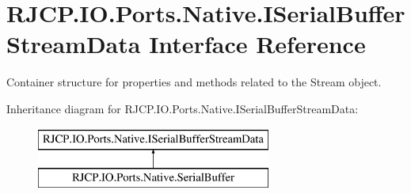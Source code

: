 \hypertarget{interface_r_j_c_p_1_1_i_o_1_1_ports_1_1_native_1_1_i_serial_buffer_stream_data}{}\section{R\+J\+C\+P.\+I\+O.\+Ports.\+Native.\+I\+Serial\+Buffer\+Stream\+Data Interface Reference}
\label{interface_r_j_c_p_1_1_i_o_1_1_ports_1_1_native_1_1_i_serial_buffer_stream_data}


Container structure for properties and methods related to the Stream object.  


Inheritance diagram for R\+J\+C\+P.\+I\+O.\+Ports.\+Native.\+I\+Serial\+Buffer\+Stream\+Data\+:\begin{figure}[H]
\begin{center}
\leavevmode
\includegraphics[height=2.000000cm]{interface_r_j_c_p_1_1_i_o_1_1_ports_1_1_native_1_1_i_serial_buffer_stream_data}
\end{center}
\end{figure}
